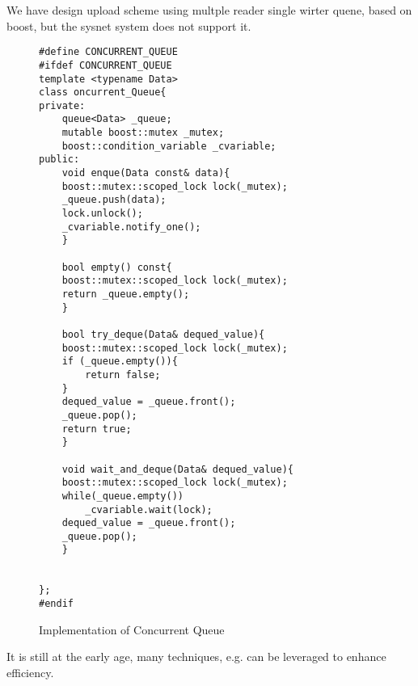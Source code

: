 
We have design upload scheme using multple reader single wirter quene, based 
on boost, but the sysnet system does 
not support it.











\begin{figure}
\centering
\begin{lstlisting}
#define CONCURRENT_QUEUE
#ifdef CONCURRENT_QUEUE
template <typename Data>
class oncurrent_Queue{
private:
    queue<Data> _queue;
    mutable boost::mutex _mutex;
    boost::condition_variable _cvariable;
public:
    void enque(Data const& data){
	boost::mutex::scoped_lock lock(_mutex);
	_queue.push(data);
	lock.unlock();
	_cvariable.notify_one();    
    }

    bool empty() const{
	boost::mutex::scoped_lock lock(_mutex);
	return _queue.empty();    
    }

    bool try_deque(Data& dequed_value){
	boost::mutex::scoped_lock lock(_mutex);
	if (_queue.empty()){
	    return false;
	}    
	dequed_value = _queue.front();
	_queue.pop();
	return true;
    }

    void wait_and_deque(Data& dequed_value){
	boost::mutex::scoped_lock lock(_mutex);
	while(_queue.empty())
	    _cvariable.wait(lock);
	dequed_value = _queue.front();
	_queue.pop();    
    }


};
#endif
\end{lstlisting}
\caption{Implementation of Concurrent Queue}
\end{figure}




  
  
  


It is still at the early age, many techniques, e.g.\cite{memcached2013}
can be leveraged to enhance efficiency.

